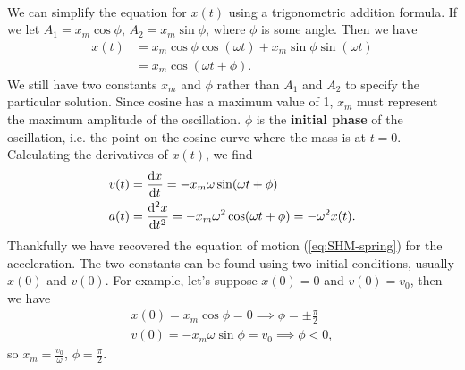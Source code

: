 \documentclass[../classical_mechanics.tex]{subfiles}
\begin{document}
        \paragraph{}
        We can simplify the equation for $x(t)$ using a trigonometric addition formula.
        If we let $A_1=x_m\cos\phi$, $A_2=x_m\sin\phi$, where $\phi$ is some angle.
        Then we have
        \begin{align}
            x(t)&=x_m\cos\phi\cos(\omega t)+x_m\sin\phi\sin(\omega t)\\
            &=x_m\cos(\omega t+\phi)\label{eq:SHM-displacement}.
        \end{align}
        We still have two constants $x_m$ and $\phi$ rather than $A_1$ and $A_2$ to specify the particular solution.
        Since cosine has a maximum value of 1, $x_m$ must represent the maximum amplitude of the oscillation.
        $\phi$ is the \textbf{initial phase} of the oscillation, i.e. the point on the cosine curve where the mass is at $t=0$.
        Calculating the derivatives of $x(t)$, we find
        \begin{align}
            v(t)&=\dv{x}{t}=-x_m\omega\sin(\omega t+\phi)\label{eq:SHM-velocity}\\
            a(t)&=\dv[2]{x}{t}=-x_m\omega^2\cos(\omega t+\phi)=-\omega^2x(t)\label{eq:SHM-acceleration}.
        \end{align}
        Thankfully we have recovered the equation of motion (\ref{eq:SHM-spring}) for the acceleration.
        The two constants can be found using two initial conditions, usually $x(0)$ and $v(0)$.
        For example, let's suppose $x(0)=0$ and $v(0)=v_0$, then we have
        \begin{align}
            x(0)=x_m\cos\phi=0\implies\phi=\pm\frac{\pi}{2}\\
            v(0)=-x_m\omega\sin\phi=v_0\implies\phi<0,
        \end{align}
        so $x_m=\frac{v_0}{\omega}$, $\phi=\frac{\pi}{2}$.
\end{document}
